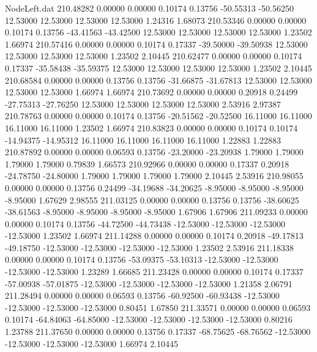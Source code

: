 \begin{filecontents}{NodeLeft.dat}
 210.48282    0.00000    0.00000     0.10174    0.13756  -50.55313  -50.56250   12.53000   12.53000   12.53000   12.53000    1.24316    1.68073
 210.53346    0.00000    0.00000     0.10174    0.13756  -43.41563  -43.42500   12.53000   12.53000   12.53000   12.53000    1.23502    1.66974
 210.57416    0.00000    0.00000     0.10174    0.17337  -39.50000  -39.50938   12.53000   12.53000   12.53000   12.53000    1.23502    2.10445
 210.62477    0.00000    0.00000     0.10174    0.17337  -35.58438  -35.59375   12.53000   12.53000   12.53000   12.53000    1.23502    2.10445
 210.68584    0.00000    0.00000     0.13756    0.13756  -31.66875  -31.67813   12.53000   12.53000   12.53000   12.53000    1.66974    1.66974
 210.73692    0.00000    0.00000     0.20918    0.24499  -27.75313  -27.76250   12.53000   12.53000   12.53000   12.53000    2.53916    2.97387
 210.78763    0.00000    0.00000     0.10174    0.13756  -20.51562  -20.52500   16.11000   16.11000   16.11000   16.11000    1.23502    1.66974
 210.83823    0.00000    0.00000     0.10174    0.10174  -14.94375  -14.95312   16.11000   16.11000   16.11000   16.11000    1.22883    1.22883
 210.87892    0.00000    0.00000     0.06593    0.13756  -23.20000  -23.20938    1.79000    1.79000    1.79000    1.79000    0.79839    1.66573
 210.92966    0.00000    0.00000     0.17337    0.20918  -24.78750  -24.80000    1.79000    1.79000    1.79000    1.79000    2.10445    2.53916
 210.98055    0.00000    0.00000     0.13756    0.24499  -34.19688  -34.20625   -8.95000   -8.95000   -8.95000   -8.95000    1.67629    2.98555
 211.03125    0.00000    0.00000     0.13756    0.13756  -38.60625  -38.61563   -8.95000   -8.95000   -8.95000   -8.95000    1.67906    1.67906
 211.09233    0.00000    0.00000     0.10174    0.13756  -44.72500  -44.73438  -12.53000  -12.53000  -12.53000  -12.53000    1.23502    1.66974
 211.14288    0.00000    0.00000     0.10174    0.20918  -49.17813  -49.18750  -12.53000  -12.53000  -12.53000  -12.53000    1.23502    2.53916
 211.18338    0.00000    0.00000     0.10174    0.13756  -53.09375  -53.10313  -12.53000  -12.53000  -12.53000  -12.53000    1.23289    1.66685
 211.23428    0.00000    0.00000     0.10174    0.17337  -57.00938  -57.01875  -12.53000  -12.53000  -12.53000  -12.53000    1.21358    2.06791
 211.28494    0.00000    0.00000     0.06593    0.13756  -60.92500  -60.93438  -12.53000  -12.53000  -12.53000  -12.53000    0.80451    1.67850
 211.33571    0.00000    0.00000     0.06593    0.10174  -64.84063  -64.85000  -12.53000  -12.53000  -12.53000  -12.53000    0.80216    1.23788
 211.37650    0.00000    0.00000     0.13756    0.17337  -68.75625  -68.76562  -12.53000  -12.53000  -12.53000  -12.53000    1.66974    2.10445

\end{filecontents}
